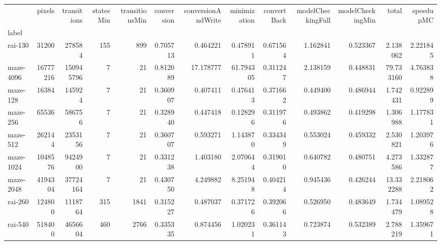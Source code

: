 \begin{tabular}{lrrrrrrrrrrrr}
\toprule
{} &    pixels &  transitions &  statesMin &  transitionsMin &  conversion &  conversionAndWrite &  minimization &  convertBack &  modelCheckingFull &  modelCheckingMin &       total &  speedupMC \\
label     &           &              &            &                 &             &                     &               &              &                    &                   &             &            \\
\midrule
rai-130   &     31200 &       278584 &        155 &             899 &    0.705713 &            0.464221 &      0.478911 &     0.671564 &           1.162841 &          0.523367 &    2.138062 &   2.221845 \\
maze-4096 &  16777216 &    150945796 &          7 &              21 &    0.812089 &           17.178777 &     61.794305 &     0.311247 &           2.138159 &          0.448831 &   79.733160 &   4.763838 \\
maze-128  &     16384 &       145924 &          7 &              21 &    0.360907 &            0.407411 &      0.476413 &     0.371662 &           0.449400 &          0.486944 &    1.742431 &   0.922899 \\
maze-256  &     65536 &       586756 &          7 &              21 &    0.328940 &            0.447418 &      0.128296 &     0.311976 &           0.493862 &          0.419298 &    1.306988 &   1.177831 \\
maze-512  &    262144 &      2353156 &          7 &              21 &    0.360707 &            0.593271 &      1.143870 &     0.334349 &           0.553024 &          0.459332 &    2.530821 &   1.203976 \\
maze-1024 &   1048576 &      9424900 &          7 &              21 &    0.331238 &            1.403180 &      2.070644 &     0.319010 &           0.640782 &          0.480751 &    4.273586 &   1.332877 \\
maze-2048 &   4194304 &     37724164 &          7 &              21 &    0.430750 &            4.249882 &      8.251948 &     0.404214 &           0.945436 &          0.426244 &   13.332288 &   2.218062 \\
rai-260   &    124800 &      1118764 &        315 &            1841 &    0.315227 &            0.487037 &      0.371726 &     0.392066 &           0.526950 &          0.483649 &    1.734479 &   1.089528 \\
rai-540   &    518400 &      4656604 &        460 &            2766 &    0.335335 &            0.874456 &      1.020231 &     0.361143 &           0.723874 &          0.532389 &    2.788219 &   1.359671 \\

\end{tabular}
